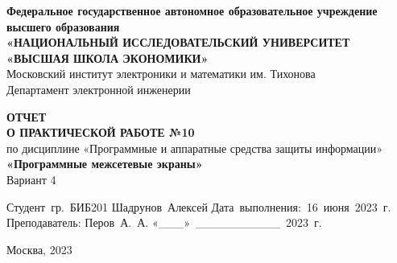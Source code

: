 
\begin{titlepage}
    \begin{center}

        \timesfont
        {\large\bf\timesfont Федеральное‌ ‌государственное‌ ‌автономное‌ ‌образовательное‌ ‌учреждение‌ ‌высшего‌ образования\\}
        {\large\bf\timesfont «НАЦИОНАЛЬНЫЙ‌ ‌ИССЛЕДОВАТЕЛЬСКИЙ‌ ‌УНИВЕРСИТЕТ‌ «ВЫСШАЯ‌ ‌ШКОЛА‌ ‌ЭКОНОМИКИ»‌\\}
        Московский‌ ‌институт‌ ‌электроники‌ ‌и‌ ‌математики‌ ‌им. Тихонова‌\\
        Департамент‌ ‌электронной‌ ‌инженерии‌\\

        \vfill
        \vfill

        {\bf\timesfont ОТЧЕТ \\
            О ПРАКТИЧЕСКОЙ РАБОТЕ №10}\\
        по дисциплине «Программные и аппаратные средства защиты информации»\\
        {\bf\timesfont «Программные межсетевые экраны»}\\
        {Вариант 4}\\


        \vfill
        \vfill
        \vfill

        \hfill\vbox
        {
            \hbox{Студент гр. БИБ201}
            \hbox{Шадрунов Алексей}
            \hbox{Дата выполнения: 16 июня 2023 г.}
            \hbox{}
            \hbox{Преподаватель:}
            \hbox{Перов А. А.}
            \hbox{«\_\_\_» \_\_\_\_\_\_\_\_\_\_ 2023 г.}
        }

        \vfill

        Москва, 2023
    \end{center}
\end{titlepage}
